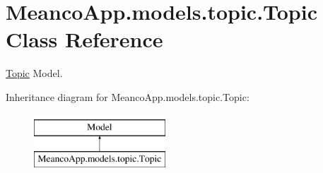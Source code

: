 \hypertarget{class_meanco_app_1_1models_1_1topic_1_1_topic}{}\section{Meanco\+App.\+models.\+topic.\+Topic Class Reference}
\label{class_meanco_app_1_1models_1_1topic_1_1_topic}


\hyperlink{class_meanco_app_1_1models_1_1topic_1_1_topic}{Topic} Model.  


Inheritance diagram for Meanco\+App.\+models.\+topic.\+Topic\+:\begin{figure}[H]
\begin{center}
\leavevmode
\includegraphics[height=2.000000cm]{class_meanco_app_1_1models_1_1topic_1_1_topic}
\end{center}
\end{figure}

